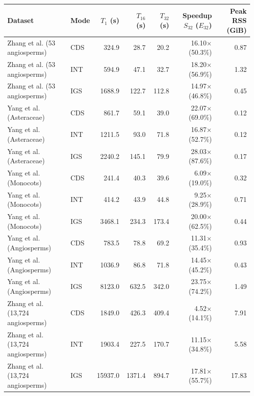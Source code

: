\begin{tabular}{llrrrrr}
\toprule
Dataset & Mode & $T_1$ (s) & $T_{16}$ (s) & $T_{32}$ (s) & Speedup $S_{32}$ ($E_{32}$) & Peak RSS (GiB) \\
\midrule
Zhang et al. (53 angiosperms) & CDS & 324.9 & 28.7 & 20.2 & 16.10$\times$ (50.3\%) & 0.87 \\
Zhang et al. (53 angiosperms) & INT & 594.9 & 47.1 & 32.7 & 18.20$\times$ (56.9\%) & 1.32 \\
Zhang et al. (53 angiosperms) & IGS & 1688.9 & 122.7 & 112.8 & 14.97$\times$ (46.8\%) & 0.45 \\
\addlinespace
Yang et al. (Asteraceae) & CDS & 861.7 & 59.1 & 39.0 & 22.07$\times$ (69.0\%) & 0.12 \\
Yang et al. (Asteraceae) & INT & 1211.5 & 93.0 & 71.8 & 16.87$\times$ (52.7\%) & 0.12 \\
Yang et al. (Asteraceae) & IGS & 2240.2 & 145.1 & 79.9 & 28.03$\times$ (87.6\%) & 0.17 \\
\addlinespace
Yang et al. (Monocots) & CDS & 241.4 & 40.3 & 39.6 & 6.09$\times$ (19.0\%) & 0.32 \\
Yang et al. (Monocots) & INT & 414.2 & 43.9 & 44.8 & 9.25$\times$ (28.9\%) & 0.71 \\
Yang et al. (Monocots) & IGS & 3468.1 & 234.3 & 173.4 & 20.00$\times$ (62.5\%) & 0.44 \\
\addlinespace
Yang et al. (Angiosperms) & CDS & 783.5 & 78.8 & 69.2 & 11.31$\times$ (35.4\%) & 0.93 \\
Yang et al. (Angiosperms) & INT & 1036.9 & 86.8 & 71.8 & 14.45$\times$ (45.2\%) & 0.43 \\
Yang et al. (Angiosperms) & IGS & 8123.0 & 632.5 & 342.0 & 23.75$\times$ (74.2\%) & 1.49 \\
\addlinespace
Zhang et al. (13,724 angiosperms) & CDS & 1849.0 & 426.3 & 409.4 & 4.52$\times$ (14.1\%) & 7.91 \\
Zhang et al. (13,724 angiosperms) & INT & 1903.4 & 227.5 & 170.7 & 11.15$\times$ (34.8\%) & 5.58 \\
Zhang et al. (13,724 angiosperms) & IGS & 15937.0 & 1371.4 & 894.7 & 17.81$\times$ (55.7\%) & 17.83 \\
\bottomrule
\end{tabular}
